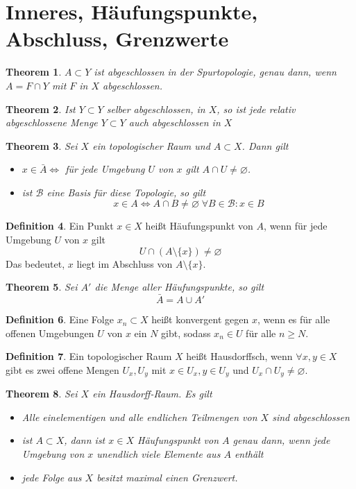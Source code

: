 \documentclass[a4paper, 12pt]{article}
\theoremstyle{plain}
\newtheorem{theorem}{Theorem}[section] %
\theoremstyle{definition}
\newtheorem{definition}[theorem]{Definition} %
\theoremstyle{lemma}
\theoremstyle{remark}
\theoremstyle{corollary}
\theoremstyle{example}
\begin{document}
\section{Inneres, Häufungspunkte, Abschluss, Grenzwerte}
	\begin{theorem}
		$A\subset Y$ ist abgeschlossen in der Spurtopologie, genau dann, wenn $A = F \cap Y$ mit $F$ in $X$ abgeschlossen.
	\end{theorem}
	\begin{theorem}
		Ist $Y\subset Y$ selber abgeschlossen, in $X$, so ist jede relativ abgeschlossene Menge $Y\subset Y$ auch abgeschlossen in $X$
	\end{theorem}
	\begin{theorem}
		Sei $X$ ein topologischer Raum und $A \subset X$. Dann gilt \begin{itemize}
			\item $x \in \bar{A} \Leftrightarrow $ für jede Umgebung $U$ von $x$ gilt $A \cap U \neq \varnothing$.
			\item ist $\mathcal{B}$ eine Basis für diese Topologie, so gilt \[x \in A \Leftrightarrow A \cap B \neq \varnothing \; \forall B \in \mathcal{B}: x \in B\]
		\end{itemize}
	\end{theorem}
	\begin{definition}
		Ein Punkt $x \in X$ heißt Häufungspunkt von $A$, wenn für jede Umgebung $U$ von $x$ gilt \[U \cap (A \setminus \{x\}) \neq \varnothing\] Das bedeutet, $x$ liegt im Abschluss von $A \setminus \{x\}$.	
	\end{definition}
	\begin{theorem}
		Sei $A'$ die Menge aller Häufungspunkte, so gilt \[\bar{A} = A \cup A'\]
	\end{theorem}
	\begin{definition}
		Eine Folge $x_n \subset X$ heißt konvergent gegen $x$, wenn es für alle offenen Umgebungen $U$ von $x$ ein $N$ gibt, sodass $x_n \in U$ für alle $n \geq N$. 
	\end{definition}
	\begin{definition}
		Ein topologischer Raum $X$ heißt Hausdorffsch, wenn $\forall x,y \in X$ gibt es zwei offene Mengen $U_x, U_y$ mit $x \in U_x, y \in U_y$ und $U_x \cap U_y \neq \varnothing$.
	\end{definition}
	\begin{theorem}
		Sei $X$ ein Hausdorff-Raum. Es gilt \begin{itemize}
			\item Alle einelementigen und alle endlichen Teilmengen von $X$ sind abgeschlossen
			\item ist $A \subset X$, dann ist $x \in X$ Häufungspunkt von $A$ genau dann, wenn jede Umgebung von $x$ unendlich viele Elemente aus $A$ enthält
			\item jede Folge aus $X$ besitzt maximal einen Grenzwert.
		\end{itemize}
	\end{theorem}
\end{document}
